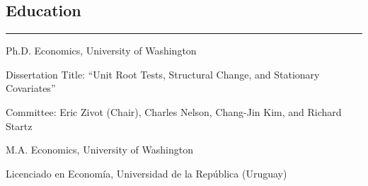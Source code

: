 \documentclass[overlapped,letterpaper,11pt]{res}
\newcommand{\cvrule}{%
  \hspace*{-\sectionwidth}%
  \rule[2mm]{\dimexpr\textwidth+\sectionwidth\relax}{.25pt}}
\newcommand{\cvsection}[1]{%
  \needspace{4\baselineskip}%
  \section{\textbf{#1}}%
  \cvrule}
\newenvironment{list1}{
  \begin{list}{\textendash}{%
      \setlength{\itemsep}{0in}
      \setlength{\parsep}{0in} \setlength{\parskip}{0in}
      \setlength{\topsep}{0in} \setlength{\partopsep}{0in}
      \setlength{\leftmargin}{0.17in}}}{\end{list}
}
\begin{document}
\begin{resume}
\cvsection{Education}
\begin{itemize}
\item [2010] Ph.D. Economics, University of Washington
	\begin{list1}
	\vspace*{.05in}
	\item[-] Dissertation Title: ``Unit Root Tests, Structural Change, and Stationary Covariates''
	\item[-] Committee:  Eric Zivot (Chair), Charles Nelson, Chang-Jin Kim, and Richard Startz
	\end{list1}
\item [2006] M.A. Economics, University of Washington
\item [2003] Licenciado en Econom\'ia, Universidad de la Rep\'ublica (Uruguay)
\end{itemize}



\end{resume}
\end{document}
